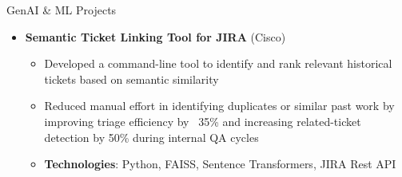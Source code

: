 \documentclass{resume} %
\begin{document}
\begin{rSection}{GenAI \& ML Projects}
\begin{itemize}
            \item \textbf{Semantic Ticket Linking Tool for JIRA} (Cisco)
                \begin{itemize}
                    \item Developed a command-line tool to identify and rank relevant historical tickets based on semantic similarity
                    \item Reduced manual effort in identifying duplicates or similar past work by improving triage efficiency by ~35\% and increasing related-ticket detection by 50\% during internal QA cycles
                    \item \textbf{Technologies}: Python, FAISS, Sentence Transformers, JIRA Rest API
                \end{itemize}
        \end{itemize}
\end{rSection}
\end{document}
